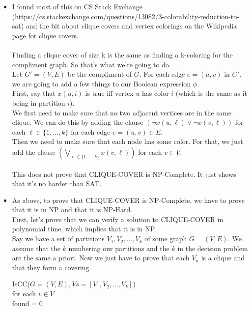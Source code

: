 \documentclass[11pt]{article}
\begin{document}
\begin{solution}
    \begin{itemize}
        \item I found most of this on CS Stack Exchange (https://cs.stackexchange.com/questions/13082/3-colorability-reduction-to-sat) and the bit about clique covers and vertex colorings on the Wikipedia page for clique covers.
            \\ \\ Finding a clique cover of size k is the same as finding a k-coloring for the compliment graph. So that's what we're going to do.
            \\ Let $G' = (V, E)$ be the compliment of $G$. For each edge $e = (u, v)$ in $G'$, we are going to add a few things to our Boolean expression $\phi$.
            \\ First, say that $x(u, i)$ is true iff vertex $u$ has color $i$ (which is the same as it being in partition $i$).
            \\ We first need to make sure that no two adjacent vertices are in the same clique. We can do this by adding the clause $(\neg x(u, \ell) \lor \neg x(v, \ell))$ for each $\ell \in \{1, \ldots, k\}$ for each edge $e = (u, v) \in E$.
            \\ Then we need to make sure that each node has some color. For that, we just add the clause $\left(\bigvee_{\ell \in \{1, \ldots, k\}} x(v, \ell)\right)$ for each $v \in V$.
            \\ \\ This does not prove that CLIQUE-COVER is NP-Complete. It just shows that it's no harder than SAT. 
        \item As above, to prove that CLIQUE-COVER is NP-Complete, we have to prove that it is in NP and that it is NP-Hard. 
            \\ First, let's prove that we can verify a solution to CLIQUE-COVER in polynomial time, which implies that it is in NP.
            \\ Say we have a set of partitions $V_1, V_2, \ldots, V_k$ of some graph $G = (V, E)$. We assume that the $k$ numbering our partitions and the $k$ in the decision problem are the same a priori. Now we just have to prove that each $V_n$ is a clique and that they form a covering.
            \begin{algo}
                IsCC($G = (V, E), Vs = [V_1, V_2,\ldots, V_k]$) \+
                \\ for each $v \in V$ \+
                \\ found = 0

\end{algo}
\end{itemize}
\end{solution}
\end{document}
